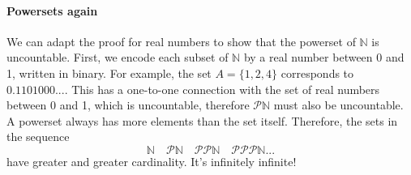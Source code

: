 \documentclass{article}
\begin{document}
\paragraph{Powersets again} We can adapt the proof for real numbers to show that the powerset of $\mathbb{N}$ is uncountable. First, we encode each subset of $\mathbb{N}$ by a real number between 0 and 1, written in binary. For example, the set $A=\{1,2,4\}$ corresponds to $0.1101000...$. This has a one-to-one connection with the set of real numbers between 0 and 1, which is uncountable, therefore $\mathscr{P}\mathbb{N}$ must also be uncountable.
\vspace{1mm}\\
A powerset always has more elements than the set itself. Therefore, the sets in the sequence
$$\mathbb{N}\quad \mathscr{P}\mathbb{N}\quad \mathscr{PP}\mathbb{N}\quad \mathscr{PPP}\mathbb{N}...$$
have greater and greater cardinality. It's infinitely infinite!
\end{document}
